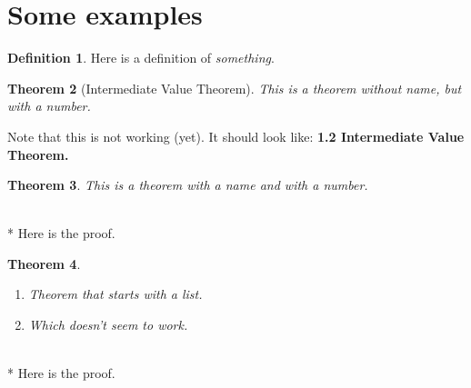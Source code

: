 \documentclass[12pt]{article}
\makeatletter
\theoremstyle{theorem}
\newtheorem{thm}{Theorem}[section]
\theoremstyle{definition}
\newtheorem{defn}[thm]{Definition}
\theoremstyle{remark}
\renewenvironment{proof}[1][\proofname] {\par\pushQED{\qed}\normalfont\topsep6\p@\@plus6\p@\relax\trivlist\item[\hskip\labelsep\bfseries#1\@addpunct{.}]\mbox{}\\*}{\popQED\endtrivlist\@endpefalse}
\makeatother
\begin{document}
\section{Some examples}

\begin{defn}
Here is a definition of \emph{something}.
\end{defn}

\begin{thm}[Intermediate Value Theorem]
This is a theorem without name, but with a number. 
\end{thm}

Note that this is not working (yet). It should look like: \newline \textbf{1.2 Intermediate Value Theorem.}

\begin{thm}
This is a theorem with a name and with a number.
\end{thm}

\begin{proof}
Here is the proof.
\end{proof}

\begin{thm}
\begin{enumerate}
\item Theorem that starts with a list.
\item Which doesn't seem to work.
\end{enumerate}
\end{thm}

\begin{proof}
Here is the proof.
\end{proof}
\end{document}
